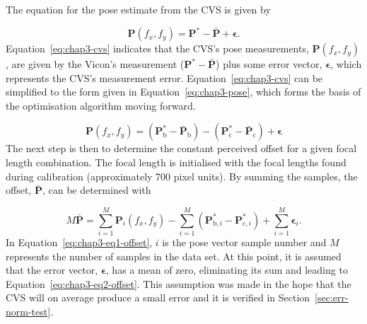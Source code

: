 The equation for the pose estimate from the CVS is given by

\begin{equation}
  \label{eq:chap3-cvs}
  \bm{P}(f_x, f_y) = \bm{P}^* - \bar{\bm{P}} + \bm{\epsilon}.
\end{equation}
Equation~\ref{eq:chap3-cvs} indicates that the CVS's pose measurements, $\bm{P}(f_x, f_y)$, are given by the Vicon's measurement ($\bm{P}^* - \bar{\bm{P}}$) plus some error vector, $\bm{\epsilon}$, which represents the CVS's measurement error. Equation~\ref{eq:chap3-cvs} can be simplified to the form given in Equation~\ref{eq:chap3-pose}, which forms the basis of the optimisation algorithm moving forward.  

\begin{equation}
  \label{eq:chap3-pose}
  \bm{P}(f_x, f_y) = (\bm{P}^*_\mathrm{b} - \bar{\bm{P}}_\mathrm{b}) - (\bm{P}^*_\mathrm{c} - \bar{\bm{P}}_\mathrm{c}) + \bm{\epsilon}
\end{equation}
The next step is then to determine the constant perceived offset for a given focal length combination. The focal length is initialised with the focal lengths found during calibration (approximately 700 pixel units). By summing the samples, the offset, $\bm{\bar{P}}$, can be determined with  

\begin{equation}
  \label{eq:chap3-eq1-offset}
  M\bar{\bm{P}} = \sum\limits_{i=1}^M \bm{P}_i(f_x, f_y) - \sum\limits_{i=1}^M(\bm{P}^*_{\mathrm{b},i} - \bm{P}^*_{\mathrm{c}, i}) + \sum\limits_{i=1}^M\bm{\epsilon}_i.
\end{equation}
In Equation~\ref{eq:chap3-eq1-offset}, $i$ is the pose vector sample number and $M$ represents the number of samples in the data set. At this point, it is assumed that the error vector, $\bm{\epsilon}$, has a mean of zero, eliminating its sum and leading to Equation~\ref{eq:chap3-eq2-offset}. This assumption was made in the hope that the CVS will on average produce a small error and it is verified in Section~\ref{sec:err-norm-test}. 

